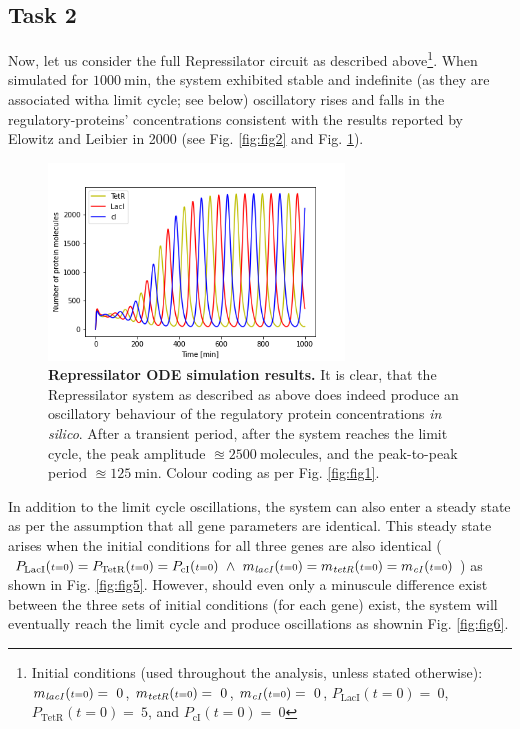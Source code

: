 \documentclass[runningheads,a4paper]{llncs}
\begin{document}
\subsection*{Task 2}
Now, let us consider the full Repressilator circuit as described above\footnote{Initial conditions (used throughout the analysis, unless stated otherwise): $m_{\textrm{\textit{lacI}}}({\scriptstyle t=0}) =\ 0$, $m_{\textrm{\textit{tetR}}}({\scriptstyle t=0}) =\ 0$, $m_{\textrm{\textit{cI}}}({\scriptstyle t=0}) =\ 0$, $P_{\textrm{LacI}}({\scriptstyle t=0}) =\ 0$, $P_{\textrm{TetR}}({\scriptstyle t=0}) =\ 5$, and $P_{\textrm{cI}}({\scriptstyle t=0}) =\ 0$}. When simulated for $1000\ \textrm{min}$, the system exhibited stable and indefinite (as they are associated with\linebreak a limit cycle; see below) oscillatory rises and falls in the regulatory-proteins' concentrations consistent with the results reported by Elowitz and Leibier in 2000 (see Fig. \ref{fig:fig2} and Fig. \ref{fig:fig4})\cite{Elowitz2000d}.

\vspace{-3\abovedisplayskip}
\begin{figure}
    \singlespacing
    \centering
    \includegraphics[width=0.70\textwidth]{suplementary_information_and_code/Task2_figure1.png}
    \caption{\textbf{Repressilator ODE simulation results.} It is clear, that the Repressilator system as described as above does indeed produce an oscillatory behaviour of the regulatory protein concentrations \textit{in silico}. After a transient period, after the system reaches the limit cycle, the peak amplitude $\approxeq 2500\ \textrm{molecules}$, and the peak-to-peak period $\approxeq 125\ \textrm{min}$. Colour coding as per Fig. \ref{fig:fig1}.}  
    \label{fig:fig4}
\end{figure}

In addition to the limit cycle oscillations, the system can also enter a steady state as per the assumption that all gene parameters are identical. This steady state arises when the initial conditions for all three genes are also identical ($P_{\textrm{LacI}}({\scriptstyle t=0}) = P_{\textrm{TetR}}({\scriptstyle t=0}) = P_{\textrm{cI}}({\scriptstyle t=0})\ \wedge\ m_{\textrm{\textit{lacI}}}({\scriptstyle t=0}) = m_{\textrm{\textit{tetR}}}({\scriptstyle t=0}) = m_{\textrm{\textit{cI}}}({\scriptstyle t=0})$) as shown in Fig. \ref{fig:fig5}. However, should even only a minuscule difference exist between the three sets of initial conditions (for each gene) exist, the system will eventually reach the limit cycle and produce oscillations as shown\linebreak in Fig. \ref{fig:fig6}.
\end{document}
